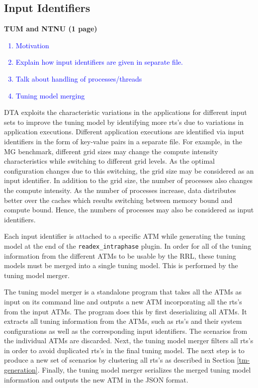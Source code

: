 \subsection{Input Identifiers} \label{sec:input}
\textbf{TUM and NTNU (1 page)}
\textcolor{blue}{
\begin{enumerate}
	\item Motivation
	\item Explain how input identifiers are given in separate file.
	\item Talk about handling of processes/threads
	\item Tuning model merging
\end{enumerate}}
DTA exploits the characteristic variations in the applications for different input sets to improve the tuning model by identifying more rts's due to variations in application executions. Different application executions are identified via input identifiers in the form of key-value pairs in a separate file. For example, in the MG benchmark, different grid sizes may change the compute intensity characteristics while switching to different grid levels. As the optimal configuration changes due to this switching, the grid size  may be considered as an input identifier. In addition to the grid size, the number of processes also changes the compute intensity. As the number of processes increase, data distributes better over the caches which results switching between memory bound and compute bound. Hence, the numbers of processes may also be considered as input identifiers.

Each input identifier is attached to a specific ATM while generating the tuning model at the end of the \texttt{readex\_intraphase} plugin. In order for all of the tuning information from the different ATMs to be usable by the RRL, these tuning models must be merged into a single tuning model. This is performed by the tuning model merger.

The tuning model merger is a standalone program that takes all the ATMs as input on its command line and outputs a new ATM incorporating all the rts's from the input ATMs. The program does this by first deserializing all ATMs. It extracts all tuning information from the ATMs, such as rts's and their system configurations as well as the corresponding input identifiers. The scenarios from the individual ATMs are discarded. Next, the tuning model merger filters all rts's in order to avoid duplicated rts's in the final tuning model. The next step is to produce a new set of scenarios by clustering all rts's as described in Section \ref{tm-generation}. Finally, the tuning model merger serializes the merged tuning model information and outputs the new ATM in the JSON format.
